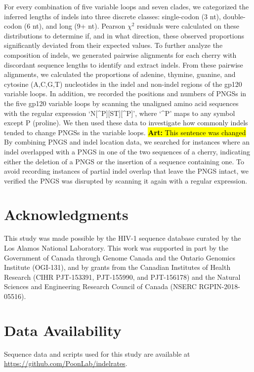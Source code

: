 \documentclass[12pt]{article}
\newcommand{\todo}[2]{\hl{\textbf{#1:} #2}}
\begin{document}
For every combination of five variable loops and seven clades, we categorized the inferred lengths of indels into three discrete classes: single-codon (3 nt), double-codon (6 nt), and long (9+ nt).
Pearson $\chi^2$ residuals were calculated on these distributions to determine if, and in what direction, these observed proportions significantly deviated from their expected values. 
To further analyze the composition of indels, we generated pairwise alignments for each cherry with discordant sequence lengths to identify and extract indels.   
From these pairwise alignments, we calculated the proportions of adenine, thymine, guanine, and cytosine (A,C,G,T) nucleotides in the indel and non-indel regions of the gp120 variable loops.
In addition, we recorded the positions and numbers of PNGSs in the five gp120 variable loops by scanning the unaligned amino acid sequences with the regular expression `N[\^{}P][ST][\^{}P]', where `\^{}P' maps to any symbol except P (proline). 
We then used these data to investigate how commonly indels tended to change PNGSs in the variable loops.   
\todo{Art}{This sentence was changed}
By combining PNGS and indel location data, we searched for instances where an indel overlapped with a PNGS in one of the two sequences of a cherry, indicating either the deletion of a PNGS or the insertion of a sequence containing one.
To avoid recording instances of partial indel overlap that leave the PNGS intact, we verified the PNGS was disrupted by scanning it again with a regular expression. 


\section * {Acknowledgments}
This study was made possible by the HIV-1 sequence database curated by the Los Alamos National Laboratory. 
This work was supported in part by the Government of Canada through Genome Canada and the Ontario Genomics Institute (OGI-131), and by grants from the Canadian Institutes of Health Research (CIHR PJT-153391, PJT-155990, and PJT-156178) and the Natural Sciences and Engineering Research Council of Canada (NSERC RGPIN-2018-05516).

\section * {Data Availability}
Sequence data and scripts used for this study are available at \url{https://github.com/PoonLab/indelrates}. 

\clearpage


\end{document}
